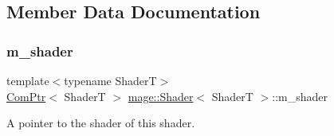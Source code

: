 \subsection{Member Data Documentation}
\hypertarget{classmage_1_1_shader_aafb44e7a8e55451cf09685d5da4aa7cb}{}\label{classmage_1_1_shader_aafb44e7a8e55451cf09685d5da4aa7cb} 
\subsubsection{\texorpdfstring{m\+\_\+shader}{m\_shader}}
{\footnotesize\ttfamily template$<$typename ShaderT$>$ \\
\hyperlink{namespacemage_ae74f374780900893caa5555d1031fd79}{Com\+Ptr}$<$ ShaderT $>$ \hyperlink{classmage_1_1_shader}{mage\+::\+Shader}$<$ ShaderT $>$\+::m\+\_\+shader\hspace{0.3cm}{\ttfamily [private]}}

A pointer to the shader of this shader. 
